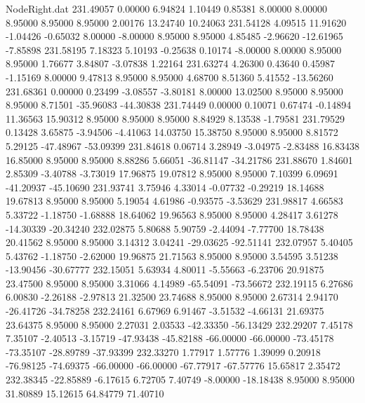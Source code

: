 \begin{filecontents}{NodeRight.dat}
 231.49057    0.00000    6.94824     1.10449    0.85381    8.00000    8.00000    8.95000    8.95000    8.95000    2.00176   13.24740   10.24063
 231.54128    4.09515   11.91620    -1.04426   -0.65032    8.00000   -8.00000    8.95000    8.95000    4.85485   -2.96620  -12.61965   -7.85898
 231.58195    7.18323    5.10193    -0.25638    0.10174   -8.00000    8.00000    8.95000    8.95000    1.76677    3.84807   -3.07838    1.22164
 231.63274    4.26300    0.43640     0.45987   -1.15169    8.00000    9.47813    8.95000    8.95000    4.68700    8.51360    5.41552  -13.56260
 231.68361    0.00000    0.23499    -3.08557   -3.80181    8.00000   13.02500    8.95000    8.95000    8.95000    8.71501  -35.96083  -44.30838
 231.74449    0.00000    0.10071     0.67474   -0.14894   11.36563   15.90312    8.95000    8.95000    8.95000    8.84929    8.13538   -1.79581
 231.79529    0.13428    3.65875    -3.94506   -4.41063   14.03750   15.38750    8.95000    8.95000    8.81572    5.29125  -47.48967  -53.09399
 231.84618    0.06714    3.28949    -3.04975   -2.83488   16.83438   16.85000    8.95000    8.95000    8.88286    5.66051  -36.81147  -34.21786
 231.88670    1.84601    2.85309    -3.40788   -3.73019   17.96875   19.07812    8.95000    8.95000    7.10399    6.09691  -41.20937  -45.10690
 231.93741    3.75946    4.33014    -0.07732   -0.29219   18.14688   19.67813    8.95000    8.95000    5.19054    4.61986   -0.93575   -3.53629
 231.98817    4.66583    5.33722    -1.18750   -1.68888   18.64062   19.96563    8.95000    8.95000    4.28417    3.61278  -14.30339  -20.34240
 232.02875    5.80688    5.90759    -2.44094   -7.77700   18.78438   20.41562    8.95000    8.95000    3.14312    3.04241  -29.03625  -92.51141
 232.07957    5.40405    5.43762    -1.18750   -2.62000   19.96875   21.71563    8.95000    8.95000    3.54595    3.51238  -13.90456  -30.67777
 232.15051    5.63934    4.80011    -5.55663   -6.23706   20.91875   23.47500    8.95000    8.95000    3.31066    4.14989  -65.54091  -73.56672
 232.19115    6.27686    6.00830    -2.26188   -2.97813   21.32500   23.74688    8.95000    8.95000    2.67314    2.94170  -26.41726  -34.78258
 232.24161    6.67969    6.91467    -3.51532   -4.66131   21.69375   23.64375    8.95000    8.95000    2.27031    2.03533  -42.33350  -56.13429
 232.29207    7.45178    7.35107    -2.40513   -3.15719  -47.93438  -45.82188  -66.00000  -66.00000  -73.45178  -73.35107  -28.89789  -37.93399
 232.33270    1.77917    1.57776     1.39099    0.20918  -76.98125  -74.69375  -66.00000  -66.00000  -67.77917  -67.57776   15.65817    2.35472
 232.38345  -22.85889   -6.17615     6.72705    7.40749   -8.00000  -18.18438    8.95000    8.95000   31.80889   15.12615   64.84779   71.40710

\end{filecontents}
